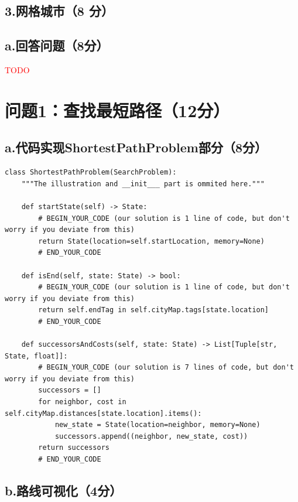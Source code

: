 \documentclass{article}
\begin{document}
\subsection*{3.网格城市（8 分）}

\subsection*{a.回答问题（8分）}
\textcolor{red}{TODO}



\section*{问题1：查找最短路径（12分）}
\subsection*{a.代码实现ShortestPathProblem部分（8分）}
\begin{lstlisting}
class ShortestPathProblem(SearchProblem):
    """The illustration and __init___ part is ommited here."""

    def startState(self) -> State:
        # BEGIN_YOUR_CODE (our solution is 1 line of code, but don't worry if you deviate from this)
        return State(location=self.startLocation, memory=None)
        # END_YOUR_CODE

    def isEnd(self, state: State) -> bool:
        # BEGIN_YOUR_CODE (our solution is 1 line of code, but don't worry if you deviate from this)
        return self.endTag in self.cityMap.tags[state.location]
        # END_YOUR_CODE

    def successorsAndCosts(self, state: State) -> List[Tuple[str, State, float]]:
        # BEGIN_YOUR_CODE (our solution is 7 lines of code, but don't worry if you deviate from this)
        successors = []
        for neighbor, cost in self.cityMap.distances[state.location].items():
            new_state = State(location=neighbor, memory=None)
            successors.append((neighbor, new_state, cost))
        return successors
        # END_YOUR_CODE
\end{lstlisting}

\subsection*{b.路线可视化（4分）}
\end{document}
